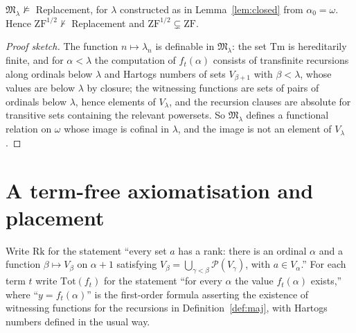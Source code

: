 \documentclass[10pt]{article}
\newcommand{\ZF}{\mathrm{ZF}}
\newcommand{\ZFh}{\mathrm{ZF}^{1/2}}
\newcommand{\PP}{\mathcal{P}}
\newcommand{\Terms}{\mathrm{Tm}}
\newcommand{\M}{\mathfrak M}
\begin{document}
\begin{proposition}\label{prop:norepl}
$\M_\lambda\not\models$ Replacement, for $\lambda$ constructed as in
Lemma~\ref{lem:closed} from $\alpha_0=\omega$. Hence $\ZFh\nvdash$
Replacement and $\ZFh\subsetneq\ZF$.
\end{proposition}
\begin{proof}[Proof sketch]
The function $n\mapsto\lambda_n$ is definable in $\M_\lambda$: the set
$\Terms$ is hereditarily finite, and for $\alpha<\lambda$ the computation
of $f_t(\alpha)$ consists of transfinite recursions along ordinals below
$\lambda$ and Hartogs numbers of sets $V_{\beta+1}$ with $\beta<\lambda$,
whose values are below $\lambda$ by closure; the witnessing functions are
sets of pairs of ordinals below $\lambda$, hence elements of $V_\lambda$,
and the recursion clauses are absolute for transitive sets containing the
relevant powersets. So $\M_\lambda$ defines a functional relation on
$\omega$ whose image is cofinal in $\lambda$, and the image is not an
element of $V_\lambda$.
\end{proof}

\section{A term-free axiomatisation and placement}\label{sec:termfree}

Write $\mathrm{Rk}$ for the statement ``every set $a$ has a rank: there
is an ordinal $\alpha$ and a function $\beta\mapsto V_\beta$ on $\alpha+1$
satisfying $V_\beta=\bigcup_{\gamma<\beta}\PP(V_\gamma)$, with
$a\in V_\alpha$.'' For each term $t$ write $\mathrm{Tot}(f_t)$ for the
statement ``for every $\alpha$ the value $f_t(\alpha)$ exists,'' where
``$y=f_t(\alpha)$'' is the first-order formula asserting the existence of
witnessing functions for the recursions in Definition~\ref{def:maj}, with
Hartogs numbers defined in the usual way.
\end{document}
